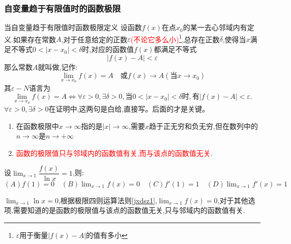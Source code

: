 \documentclass[8pt a4paper, oneside, UTF8]{ctexbook}
\begin{document}
\begin{sloppypar}
    \subsubsection{自变量趋于有限值时的函数极限}
    \begin{defn}{当自变量趋于有限值时函数极限定义}{}
        设函数$f(x)$在点$x_0$的某一去心邻域内有定义.如果存在常数$A$,对于任意给定的正数$\varepsilon$\textcolor{red}{(不论它多么小)\footnote{$\varepsilon$用于衡量$|f(x)-A|$的值有多小}},总存在正数$\delta$,使得当$x$满足不等式$0<|x-x_0|<\delta$时,对应的函数值$f(x)$都满足不等式
        $$
            |f(x)-A|<\varepsilon
        $$
        那么常数$A$就叫做,记作:
        $$
            \lim_{x\to x_0}f(x)=A\quad\text{或}f(x)\to A(\text{当}x\to x_0)
        $$
        其$\varepsilon-N$语言为
        $$
            \lim_{x\to x_0}f(x)=A\Leftrightarrow\forall\varepsilon>0,\exists\delta>0,\text{当}0<|x-x_0|<\delta\text{时},\text{有}|f(x)-A|<\varepsilon.
        $$
        $\forall\varepsilon>0,\exists\delta>0$在证明中,这两句是白给,直接写。后面的才是关键。
    \end{defn}
    \begin{criterion}{}{}
        \begin{enumerate}
            \item 在函数极限中$x \to \infty$指的是$|x| \to \infty$,需要$x$趋于正无穷和负无穷,但在数列中的$n \to \infty$是$n \to +\infty$
            \item \textcolor{red}{函数的极限值只与邻域内的函数值有关,而与该点的函数值无关}.
        \end{enumerate}
    \end{criterion}
    \begin{problem}
        设$\lim_{x \to 1}\dfrac{f(x)}{\ln x}=1$,则:\\
        $(A) f(1)=0 \quad (B)\lim_{x\to 1}f(x)=0 \quad (C)f'(1)=1 \quad (D)\lim_{x \to 1}f'(x)=1$
    \end{problem}
    \begin{solution}
        $\lim_{x\to 1}\ln x=0$,根据极限四则运算法则\ref{jxdsz1},$\lim_{x \to 1} f(x)=0$,对于其他选项,需要知道的是函数的极限值与该点的函数值无关,只与邻域内的函数值有关.
    \end{solution}

\end{sloppypar}
\end{document}
